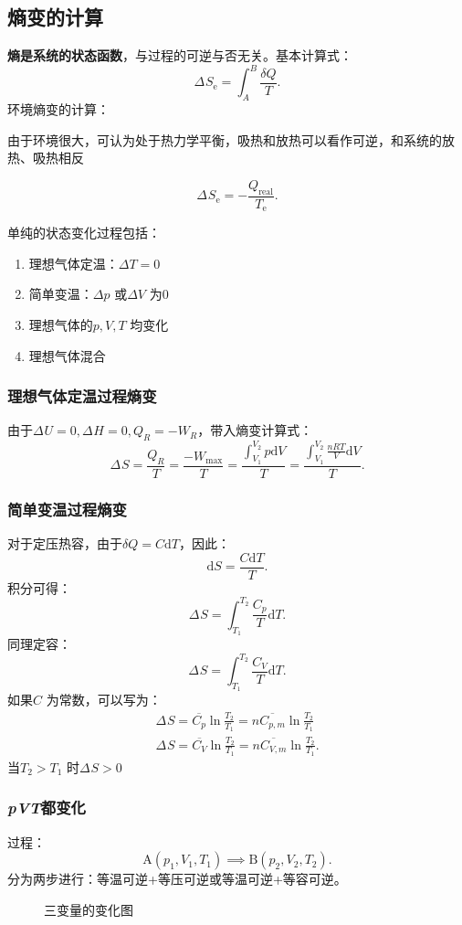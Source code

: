 \subsection{熵变的计算}%
\label{sub:熵变的计算}
\textbf{熵是系统的状态函数}，与过程的可逆与否无关。基本计算式：\[
    \Delta_\text{}S_{\text{e}} = \int_{A}^{B} \frac{\delta Q}{T} 
.\]
环境熵变的计算：
\begin{notation}
    由于环境很大，可认为处于热力学平衡，吸热和放热可以看作可逆，和系统的放热、吸热相反
\end{notation}
\[
    \Delta_\text{}S_{\text{e}} = -\frac{Q_\text{real}}{T_\text{e}} 
.\]
\begin{notation}
    单纯的状态变化过程包括：
    \begin{enumerate}
        \item 理想气体定温：$\Delta T = 0$
        \item 简单变温：$\Delta p$ 或$\Delta V$ 为0
        \item 理想气体的$p,V,T$ 均变化
        \item 理想气体混合
    \end{enumerate}
\end{notation}
\subsubsection*{理想气体定温过程熵变}%
\label{subsub*:理想气体定温过程熵变}
由于$\Delta_\text{}U =0,\Delta_\text{}H=0,Q_R = -W_R$，带入熵变计算式：\[
    \Delta_\text{}S = \frac{Q_R}{T} = \frac{-W_{\max }}{T} = \frac{\int_{V_1}^{V_2} p \mathrm{d}V}{T} = \frac{\int_{V_1}^{V_2} \frac{nRT }{V}  \mathrm{d}V}{T} 
.\]
\subsubsection*{简单变温过程熵变}%
\label{subsub*:简单变温过程熵变}
对于定压热容，由于$\delta Q = C\mathrm{d}T$，因此：\[
    \mathrm{d}S = \frac{C\mathrm{d}T}{T}
.\]
积分可得：\[
    \Delta_\text{}S = \int_{T_1}^{T_2} \frac{C_{p}}{T} \mathrm{d}T 
.\]
同理定容：\[
    \Delta_\text{}S = \int_{T_1}^{T_2} \frac{C_{V}}{T} \mathrm{d}T 
.\]
如果$C$ 为常数，可以写为：
\begin{align*}
    \Delta_\text{}S = \overline{C_{p}}\ln \frac{T_2}{T_1} =n \overline{C_{p,m}}\ln \frac{T_2}{T_1}\\
    \Delta_\text{}S = \overline{C_{V}}\ln \frac{T_2}{T_1} =n \overline{C_{V,m}}\ln \frac{T_2}{T_1}
.\end{align*}
当$T_2>T_1$ 时$\Delta_\text{}S>0 $
\subsubsection*{\textit{pVT}都变化}%
\label{subsub*:-textit-pVT-都变化}
过程：\[
    \text{A}\left( p_1,V_1,T_1 \right) \implies \text{B}\left( p_2,V_2,T_2 \right)
.\]
分为两步进行：等温可逆+等压可逆或等温可逆+等容可逆。
\begin{figure}[ht!]
    \centering
    \caption{三变量的变化图}
    \label{fig:三变量的变化图}
\end{figure}
